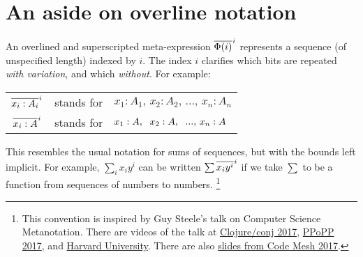 \documentclass{rntz}
\begin{document}

\section{An aside on overline notation}


\newcommand{\xbar}[2]{{\overline{#2}^{\hspace{.5pt}#1}}}

\newcommand{\Expr}{\Phi}
\newcommand{\Ix}[1]{#1}
\newcommand{\Ex}{{x}}
\newcommand{\Ay}{{A}}

An overlined and superscripted meta-expression $\xbar{i}{\Expr(i)}$ represents a
sequence (of unspecified length) indexed by $i$. The index $i$ clarifies which
bits are repeated \emph{with variation}, and which \emph{without}. For example:

\begin{center}
  \begin{tabular}{ccl}
    $\xbar{\Ix{i}}{\Ex_{\Ix{i}} : \Ay_{\Ix{i}}}$
    & stands for
    & $\Ex_{\Ix{1}} : \Ay_{\Ix{1}},\, \Ex_{\Ix{2}} : \Ay_{\Ix{2}},\, ...,\, \Ex_{\Ix{n}} : \Ay_{\Ix{n}}$
    \vspace{.5em}\\
    $\xbar{\Ix{i}}{\Ex_{\Ix{i}} : \Ay}$
    & stands for
    & $\Ex_{\Ix{1}} : \Ay,\hspace{0.6em} \Ex_{\Ix{2}} : \Ay,\hspace{0.6em} ...,\, \Ex_{\Ix{n}} : \Ay$
  \end{tabular}
\end{center}

This resembles the usual notation for sums of sequences, but with the bounds
left implicit. For example, $\sum_{i} x_i y^i$ can be written
$\sum\xbar{i}{x_iy^i}$ if we take $\sum$ to be a function from sequences of
numbers to numbers.%
%
\footnote{This convention is inspired by Guy Steele's talk on Computer Science
  Metanotation. There are videos of the talk at
  \href{https://www.youtube.com/watch?v=dCuZkaaou0Q}{Clojure/conj 2017},
  \href{https://www.youtube.com/watch?v=7HKbjYqqPPQ}{PPoPP 2017}, and
  \href{https://www.youtube.com/watch?v=8fCfkGFF7X8&feature=youtu.be&t=37m46s}{Harvard
    University}. There are also
  \href{http://s3.amazonaws.com/erlang-conferences-production/media/files/000/000/755/original/Guy_L._Steele_-_A_Cobbler's_Child.pdf?1510053539}{slides
    from Code Mesh 2017}.}
\end{document}

